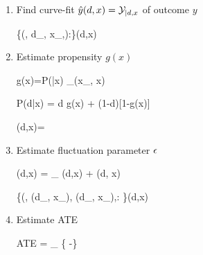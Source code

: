 \begin{enumerate}
\item Find curve-fit ${\hat{y}}(d,x)={\cal Y}_{|d,x}$ of outcome $y$

\beq
\{(\s, d_\s, x_\s,):\s\in \Sigma\}\mlarr \haty(d,x)
\eeq

\item Estimate propensity $g(x)$

\beq
g(x)=P(|x)\approx
{}
{\sum_\s \delta(x_\s, x)}
\eeq

\beq
P(d|x) = d g(x) + (1-d)[1-g(x)]
\eeq

\beq
\beta(d,x)=
\eeq

\item Estimate fluctuation parameter $\epsilon$

\beq
\eta(d,x) =
\underbrace{\logit[\haty(d, x)]}_
{\lam(d,x)}
 + \eps \beta(d, x)
\eeq

\beq
\{(\s, \lam(d_\s, x_\s),
\beta(d_\s, x_\s),:
\s\in \Sigma\}\mlarr \HAT{\eta}(d,x)
\eeq

\item Estimate ATE

\beq
ATE =  \sum_\s
\left\{
 \expit[ \HAT{\eta}(d=1,x_\s)]
 -\expit[ \HAT{\eta}(d=0,x_\s)]
 \right\}
\eeq

\end{enumerate}
